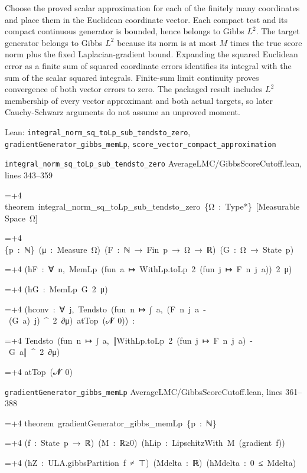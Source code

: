 \documentclass[11pt,a4paper]{article}
\newlength{\leancharwidth}
\newenvironment{leancode}{\par\smallskip\begingroup\ttfamily\footnotesize\raggedright
  \settowidth{\leancharwidth}{M}\setlength{\parskip}{0pt}\setlength{\parindent}{0pt}
  \frenchspacing}{\par\endgroup\smallskip}
\newcommand{\leanline}[2]{\hangindent=\dimexpr#1\leancharwidth+4\leancharwidth\relax
  \hangafter=1\noindent\hspace*{#1\leancharwidth}#2\par}
\newcommand{\leansource}[1]{\par{\footnotesize\color{leanmuted}#1}\par}
\begin{document}
Choose the proved scalar approximation for each of the finitely many coordinates and place them in the Euclidean coordinate vector. Each compact test and its compact continuous generator is bounded, hence belongs to Gibbs \(L^{2}\). The target generator belongs to Gibbs \(L^{2}\) because its norm is at most \(M\) times the true score norm plus the fixed Laplacian-gradient bound. Expanding the squared Euclidean error as a finite sum of squared coordinate errors identifies its integral with the sum of the scalar squared integrals. Finite-sum limit continuity proves convergence of both vector errors to zero. The packaged result includes \(L^{2}\) membership of every vector approximant and both actual targets, so later Cauchy-Schwarz arguments do not assume an unproved moment.

\begin{leanbox}{Lean: \texttt{integral\_\allowbreak{}norm\_\allowbreak{}sq\_\allowbreak{}toLp\_\allowbreak{}sub\_\allowbreak{}tendsto\_\allowbreak{}zero}, \texttt{gradientGenerator\_\allowbreak{}gibbs\_\allowbreak{}memLp}, \texttt{score\_\allowbreak{}vector\_\allowbreak{}compact\_\allowbreak{}approximation}}
\leansource{\texttt{integral\_\allowbreak{}norm\_\allowbreak{}sq\_\allowbreak{}toLp\_\allowbreak{}sub\_\allowbreak{}tendsto\_\allowbreak{}zero} \quad AverageLMC/\allowbreak{}GibbsScoreCutoff.lean, lines 343–359}
\begin{leancode}
\leanline{0}{theorem\ integral\_norm\_sq\_toLp\_sub\_tendsto\_zero\ \{Ω\ :\ Type*\}\ [MeasurableSpace\ Ω]}
\leanline{4}{\{p\ :\ ℕ\}\ (μ\ :\ Measure\ Ω)\ (F\ :\ ℕ\ →\ Fin\ p\ →\ Ω\ →\ ℝ)\ (G\ :\ Ω\ →\ State\ p)}
\leanline{4}{(hF\ :\ ∀\ n,\ MemLp\ (fun\ a\ ↦\ WithLp.toLp\ 2\ (fun\ j\ ↦\ F\ n\ j\ a))\ 2\ μ)}
\leanline{4}{(hG\ :\ MemLp\ G\ 2\ μ)}
\leanline{4}{(hconv\ :\ ∀\ j,\ Tendsto\ (fun\ n\ ↦\ ∫\ a,\ (F\ n\ j\ a\ -\ (G\ a)\ j)\ \textasciicircum{}\ 2\ ∂μ)\ atTop\ ({\leanfallback 𝓝}\ 0))\ :}
\leanline{4}{Tendsto\ (fun\ n\ ↦\ ∫\ a,\ ‖WithLp.toLp\ 2\ (fun\ j\ ↦\ F\ n\ j\ a)\ -\ G\ a‖\ \textasciicircum{}\ 2\ ∂μ)}
\leanline{6}{atTop\ ({\leanfallback 𝓝}\ 0)}
\end{leancode}
\leansource{\texttt{gradientGenerator\_\allowbreak{}gibbs\_\allowbreak{}memLp} \quad AverageLMC/\allowbreak{}GibbsScoreCutoff.lean, lines 361–388}
\begin{leancode}
\leanline{0}{theorem\ gradientGenerator\_gibbs\_memLp\ \{p\ :\ ℕ\}}
\leanline{4}{(f\ :\ State\ p\ →\ ℝ)\ (M\ :\ ℝ≥0)\ (hLip\ :\ LipschitzWith\ M\ (gradient\ f))}
\leanline{4}{(hZ\ :\ ULA.gibbsPartition\ f\ ≠\ ⊤)\ (Mdelta\ :\ ℝ)\ (hMdelta\ :\ 0\ ≤\ Mdelta)}

\end{leancode}
\end{leanbox}
\end{document}
